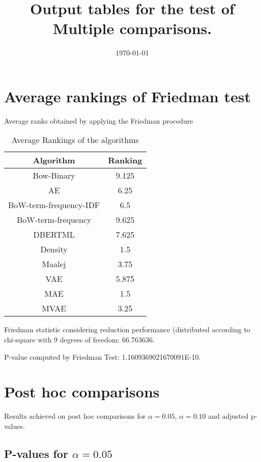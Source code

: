 \documentclass[a4paper,10pt]{article}
\title{Output tables for the test of Multiple comparisons.}
\author{}
\date{\today}
\begin{document}
\begin{landscape}
\pagestyle{empty}
\maketitle
\thispagestyle{empty}
\section{Average rankings of Friedman test}



Average ranks obtained by applying the Friedman procedure

\begin{table}[!htp]
\centering
\begin{tabular}{|c|c|}\hline
Algorithm&Ranking\\\hline
Bow-Binary & 9.125\\
AE & 6.25\\
BoW-term-frequency-IDF & 6.5\\
BoW-term-frequency & 9.625\\
DBERTML & 7.625\\
Density & 1.5\\
Maalej & 3.75\\
VAE & 5.875\\
MAE & 1.5\\
MVAE & 3.25\\
\hline
\end{tabular}
\caption{Average Rankings of the algorithms}
\end{table}

Friedman statistic considering reduction performance (distributed according to chi-square with 9 degrees of freedom: 66.763636.

P-value computed by Friedman Test: 1.1609369021670091E-10.\newline



\pagebreak

\section{Post hoc comparisons}

Results achieved on post hoc comparisons for $\alpha = 0.05$, $\alpha = 0.10$ and adjusted p-values.

\subsection{P-values for $\alpha=0.05$}


\end{landscape}
\end{document}
